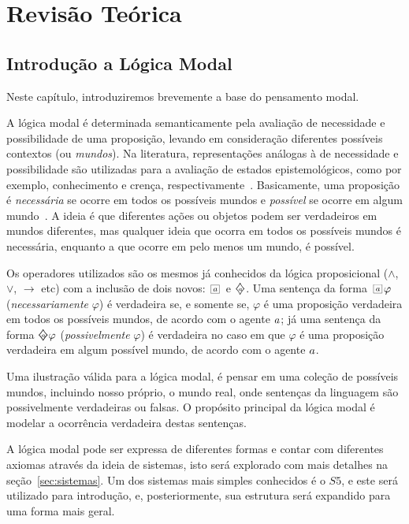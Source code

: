 \chapter{Revisão Teórica}
\label{cap:teo}

\section{Introdução a Lógica Modal}
\label{sec:l_gica_modal}
Neste capítulo, introduziremos brevemente a base do pensamento modal. 

A lógica modal é determinada semanticamente pela avaliação de necessidade e
possibilidade de uma proposição, levando em consideração diferentes possíveis
contextos (ou \emph{mundos}). Na literatura, representações análogas à de
necessidade e possibilidade são utilizadas para a avaliação de estados
epistemológicos, como por exemplo, conhecimento e crença,
respectivamente~\cite{belief}. Basicamente, uma proposição é \textit{necessária}
se ocorre em todos os possíveis mundos e \textit{possível} se ocorre em algum
mundo~\cite{chellas:modal_logic}.  A ideia é que
diferentes ações ou objetos podem ser verdadeiros em mundos diferentes, mas
qualquer ideia que ocorra em todos os possíveis mundos é necessária, enquanto a
que ocorre em pelo menos um mundo, é possível.

Os operadores utilizados são os mesmos já conhecidos da lógica proposicional
($\wedge$, $\vee$, $\rightarrow$ etc) com a inclusão de dois novos:
$\nec{\agent}$ e $\pos{\agent}$. Uma sentença da forma $\nec{\agent} \varphi$
(\textit{necessariamente} $\varphi$) é verdadeira se, e somente se, $\varphi$ é
uma proposição verdadeira em todos os possíveis mundos, de acordo com o agente
$a$; já uma sentença da forma $\pos{\agent} \varphi$
(\textit{possivelmente} $\varphi$) é verdadeira no caso em que $\varphi$ é uma
proposição verdadeira em algum possível mundo, de acordo com o agente $a$.

Uma ilustração válida para a lógica modal, é pensar em uma coleção de possíveis
mundos, incluindo nosso próprio, o mundo real, onde sentenças da linguagem são
possivelmente verdadeiras ou falsas. O propósito principal da lógica modal é
modelar a ocorrência verdadeira destas sentenças.

A lógica modal pode ser expressa de diferentes formas e contar com diferentes
axiomas através da ideia de sistemas, isto será explorado com mais detalhes 
na seção~\ref{sec:sistemas}. Um dos sistemas mais simples conhecidos é o $S5$, e
este será utilizado para introdução, e, posteriormente, sua estrutura será
expandido para uma forma mais geral.

